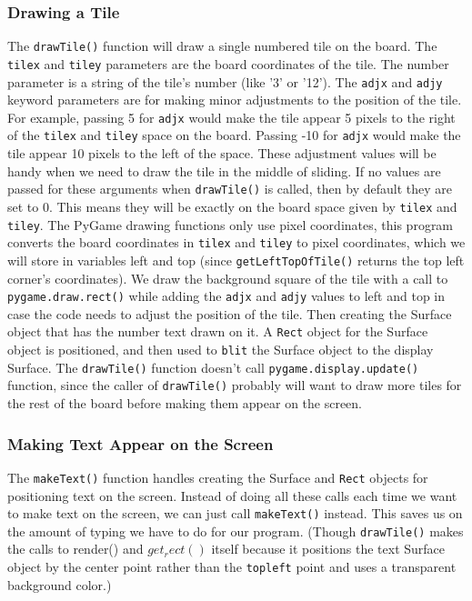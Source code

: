 \subsubsection{Drawing a Tile} %
\label{sec:subsection label} %
The \texttt{drawTile()} function will draw a single numbered tile on the board. The \texttt{tilex} and \texttt{tiley} parameters are the board coordinates of the tile. The number parameter is a string of the tile’s number (like '3' or '12'). The \texttt{adjx} and \texttt{adjy} keyword parameters are for making minor adjustments to the position of the tile. For example, passing 5 for \texttt{adjx} would make the tile appear 5 pixels to the right of the \texttt{tilex} and \texttt{tiley} space on the board. Passing -10 for \texttt{adjx} would make the tile appear 10 pixels to the left of the space.
These adjustment values will be handy when we need to draw the tile in the middle of sliding. If no values are passed for these arguments when \texttt{drawTile()} is called, then by default they are set to 0. This means they will be exactly on the board space given by \texttt{tilex} and \texttt{tiley}.
The PyGame drawing functions only use pixel coordinates, this program converts the board coordinates in \texttt{tilex} and \texttt{tiley} to pixel coordinates, which we will store in variables left and top (since \texttt{getLeftTopOfTile()} returns the top left corner’s coordinates). We draw the background square of the tile with a call to \texttt{pygame.draw.rect()} while adding the \texttt{adjx} and \texttt{adjy} values to left and top in case the code needs to adjust the position of the tile.
Then creating the Surface object that has the number text drawn on it. A \texttt{Rect} object for the Surface object is positioned, and then used to \texttt{blit} the Surface object to the display Surface. The \texttt{drawTile()} function doesn’t call \texttt{pygame.display.update()} function, since the caller of \texttt{drawTile()} probably will want to draw more tiles for the rest of the board before making them appear on the screen.
\subsubsection{Making Text Appear on the Screen} %
\label{sec:subsection label} %
The \texttt{makeText()} function handles creating the Surface and \texttt{Rect} objects for positioning text on the screen. Instead of doing all these calls each time we want to make text on the screen, we can just call \texttt{makeText()} instead. This saves us on the amount of typing we have to do for our program. (Though \texttt{drawTile()} makes the calls to render() and $get_rect()$ itself because it positions the text Surface object by the center point rather than the \texttt{topleft} point and uses a transparent background color.)
